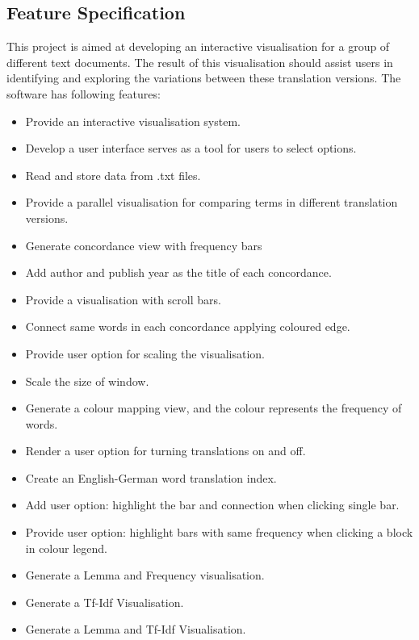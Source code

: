 \subsection{Feature Specification}
This project is aimed at developing an interactive visualisation for a group of different text documents. The result of this visualisation should assist users in identifying and exploring the variations between these translation versions. The software has following features:
\begin{itemize}
	\item \textbf{} Provide an interactive visualisation system.
	\item \textbf{} Develop a user interface serves as a tool for users to select options.
	\item \textbf{} Read and store data from .txt files.
	\item \textbf{} Provide a parallel visualisation for comparing terms in different translation versions.
	\item \textbf{} Generate concordance view with frequency bars
	\item \textbf{} Add author and publish year as the title of each concordance.
	\item \textbf{} Provide a visualisation with scroll bars.
	\item \textbf{} Connect same words in each concordance applying coloured edge.
	\item \textbf{} Provide user option for scaling the visualisation.
	\item \textbf{} Scale the size of window.
	\item \textbf{} Generate a colour mapping view, and the colour represents the frequency of words.
	\item \textbf{} Render a user option for turning translations on and off.
	\item \textbf{} Create an English-German word translation index.
	\item \textbf{} Add user option: highlight the bar and connection when clicking single bar.
	\item \textbf{} Provide user option: highlight bars with same frequency when clicking a block in colour legend.
	\item \textbf{} Generate a Lemma and Frequency visualisation.
	\item \textbf{} Generate a Tf-Idf Visualisation.
	\item \textbf{} Generate a Lemma and Tf-Idf  Visualisation.
\end{itemize}

